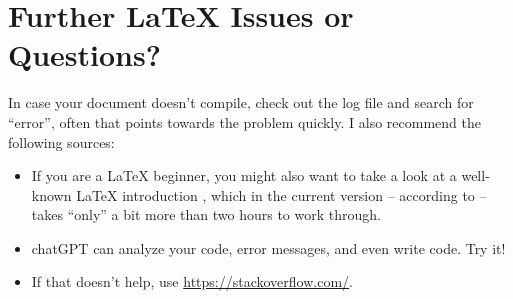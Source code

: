 \section{Further \LaTeX{} Issues or Questions?}

In case your document doesn't compile, check out the log file and search for ``error'', often that points towards the problem quickly. I also recommend the following sources:
\begin{itemize}
  \item If you are a \LaTeX{} beginner, you might also want to take a look at a well-known \LaTeX{} introduction \citep{Oetiker2021LatexIntroduction}, which in the current version -- according to \citeauthor{Oetiker2021LatexIntroduction} -- takes ``only'' a bit more than two hours to work through.
  \item chatGPT can analyze your code, error messages, and even write code. Try it!
  \item If that doesn't help, use \url{https://stackoverflow.com/}. 
\end{itemize}